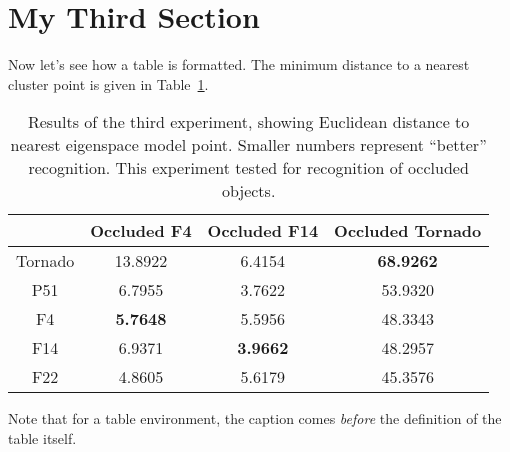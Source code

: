 \section{My Third Section}

Now let's see how a table is formatted. The minimum distance to a
nearest cluster point is given in Table~\ref{tb:results3}.
\begin{table}%
\begin{center}
\caption[Results of the experiment testing for recognition of
occluded objects.]{Results of the third experiment, showing
Euclidean distance to nearest eigenspace model point. Smaller
numbers represent ``better'' recognition. This experiment tested
for recognition of occluded objects.\\}
 \label{tb:results3}
\begin{tabular}{c|c c c} \hline
  & Occluded F4 & Occluded F14 & Occluded Tornado \\ \hline
  Tornado & 13.8922 & 6.4154 & {\bf 68.9262}\\
  P51 & 6.7955 & 3.7622 & 53.9320 \\
  F4 & {\bf 5.7648} & 5.5956 & 48.3343 \\
  F14 & 6.9371 & {\bf 3.9662} & 48.2957 \\
  F22 & 4.8605 & 5.6179 & 45.3576 \\ \hline
\end{tabular}
\end{center}
\end{table}
Note that for a table environment, the caption comes \emph{before} the
definition of the table itself.

\nocite{*} %

